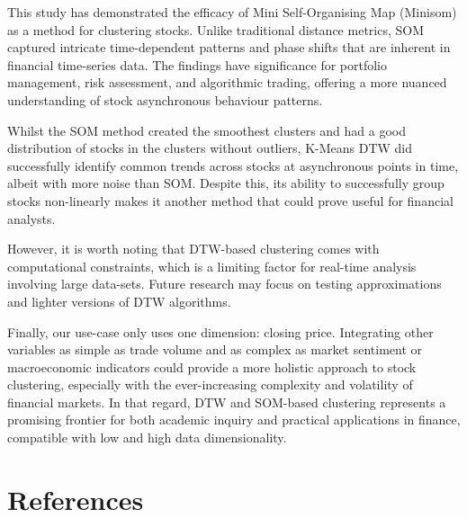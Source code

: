 \documentclass[11pt]{article}
\begin{document}
This study has demonstrated the efficacy of Mini Self-Organising Map (Minisom) as a method for clustering stocks. Unlike traditional distance metrics, SOM captured intricate time-dependent patterns and phase shifts that are inherent in financial time-series data. The findings have significance for portfolio management, risk assessment, and algorithmic trading, offering a more nuanced understanding of stock asynchronous behaviour patterns.

Whilst the SOM method created the smoothest clusters and had a good distribution of stocks in the clusters without outliers, K-Means DTW did successfully identify common trends across stocks at asynchronous points in time, albeit with more noise than SOM. Despite this, its ability to successfully group stocks non-linearly makes it another method that could prove useful for financial analysts. 

However, it is worth noting that DTW-based clustering comes with computational constraints, which is a limiting factor for real-time analysis involving large data-sets. Future research may focus on testing approximations and lighter versions of DTW algorithms. 

Finally, our use-case only uses one dimension: closing price. Integrating other variables as simple as trade volume and as complex as market sentiment or macroeconomic indicators could provide a more holistic approach to stock clustering, especially with the ever-increasing complexity and volatility of financial markets. In that regard, DTW and SOM-based clustering represents a promising frontier for both academic inquiry and practical applications in finance, compatible with low and high data dimensionality.


\newpage

\section{References}

\printbibliography[title={~}]
\end{document}
